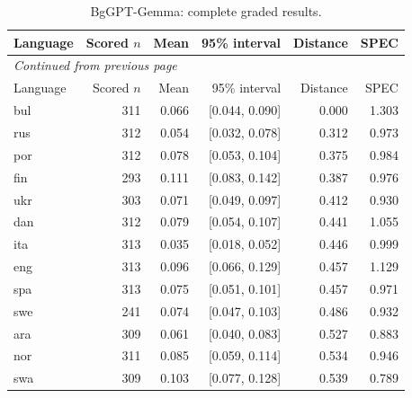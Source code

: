 \endgroup

\begingroup\footnotesize\setlength{\tabcolsep}{3pt}\renewcommand{\arraystretch}{1.12}

\begin{longtable}{lrrrrr}

\caption{BgGPT-Gemma: complete graded results.}\label{tab:detail-bggpt_gemma_9b}\\

\toprule

Language & Scored $n$ & Mean & 95\% interval & Distance & SPEC\\\midrule

\endfirsthead

\multicolumn{6}{l}{\textit{Continued from previous page}}\\

\toprule

Language & Scored $n$ & Mean & 95\% interval & Distance & SPEC\\\midrule

\endhead

\bottomrule\endfoot

bul & 311 & 0.066 & [0.044, 0.090] & 0.000 & 1.303\\

rus & 312 & 0.054 & [0.032, 0.078] & 0.312 & 0.973\\

por & 312 & 0.078 & [0.053, 0.104] & 0.375 & 0.984\\

fin & 293 & 0.111 & [0.083, 0.142] & 0.387 & 0.976\\

ukr & 303 & 0.071 & [0.049, 0.097] & 0.412 & 0.930\\

dan & 312 & 0.079 & [0.054, 0.107] & 0.441 & 1.055\\

ita & 313 & 0.035 & [0.018, 0.052] & 0.446 & 0.999\\

eng & 313 & 0.096 & [0.066, 0.129] & 0.457 & 1.129\\

spa & 313 & 0.075 & [0.051, 0.101] & 0.457 & 0.971\\

swe & 241 & 0.074 & [0.047, 0.103] & 0.486 & 0.932\\

ara & 309 & 0.061 & [0.040, 0.083] & 0.527 & 0.883\\

nor & 311 & 0.085 & [0.059, 0.114] & 0.534 & 0.946\\

swa & 309 & 0.103 & [0.077, 0.128] & 0.539 & 0.789\\

\end{longtable}

